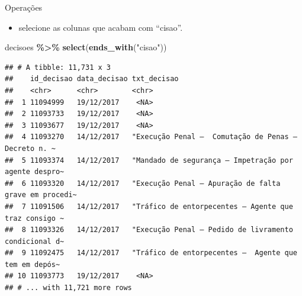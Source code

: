 \documentclass[
  10pt,
  ignorenonframetext,
]{beamer}
\newenvironment{Shaded}{\begin{snugshade}}{\end{snugshade}}
\newcommand{\KeywordTok}[1]{\textcolor[rgb]{0.13,0.29,0.53}{\textbf{#1}}}
\newcommand{\NormalTok}[1]{#1}
\newcommand{\OperatorTok}[1]{\textcolor[rgb]{0.81,0.36,0.00}{\textbf{#1}}}
\newcommand{\StringTok}[1]{\textcolor[rgb]{0.31,0.60,0.02}{#1}}
\providecommand{\tightlist}{%
  \setlength{\itemsep}{0pt}\setlength{\parskip}{0pt}}
\begin{document}
\begin{frame}[fragile]{Operações}
\protect\hypertarget{operauxe7uxf5es}{}
\begin{itemize}
\tightlist
\item
  selecione as colunas que acabam com ``cisao''.
\end{itemize}

\begin{Shaded}
\begin{Highlighting}[]
\NormalTok{decisoes }\OperatorTok{\%\textgreater{}\%}\StringTok{ }
\StringTok{  }\KeywordTok{select}\NormalTok{(}\KeywordTok{ends\_with}\NormalTok{(}\StringTok{"cisao"}\NormalTok{))}
\end{Highlighting}
\end{Shaded}

\begin{verbatim}
## # A tibble: 11,731 x 3
##    id_decisao data_decisao txt_decisao                                          
##    <chr>      <chr>        <chr>                                                
##  1 11094999   19/12/2017    <NA>                                                
##  2 11093733   19/12/2017    <NA>                                                
##  3 11093677   19/12/2017    <NA>                                                
##  4 11093270   14/12/2017   "Execução Penal –  Comutação de Penas –  Decreto n. ~
##  5 11093374   14/12/2017   "Mandado de segurança – Impetração por agente despro~
##  6 11093320   14/12/2017   "Execução Penal – Apuração de falta grave em procedi~
##  7 11091506   14/12/2017   "Tráfico de entorpecentes – Agente que traz consigo ~
##  8 11093326   14/12/2017   "Execução Penal – Pedido de livramento condicional d~
##  9 11092475   14/12/2017   "Tráfico de entorpecentes –  Agente que tem em depós~
## 10 11093773   19/12/2017    <NA>                                                
## # ... with 11,721 more rows
\end{verbatim}
\end{frame}
\end{document}
